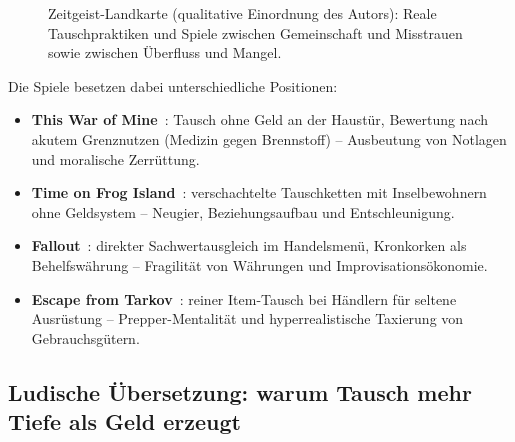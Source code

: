 \documentclass[11pt, a4paper]{article}
\begin{document}
\begin{figure}[H]
\caption[Zeitgeist-Landkarte: reale Praktiken und Spiele]{Zeitgeist-Landkarte
(qualitative Einordnung des Autors): Reale Tauschpraktiken und Spiele zwischen
Gemeinschaft und Misstrauen sowie zwischen Überfluss und Mangel.}
\label{fig:landkarte}
\end{figure}

Die Spiele besetzen dabei unterschiedliche Positionen:
\begin{itemize}
    \item \textbf{This War of Mine}~\cite{twom}: Tausch ohne Geld an der
          Haustür, Bewertung nach akutem Grenznutzen (Medizin gegen
          Brennstoff) -- Ausbeutung von Notlagen und moralische Zerrüttung.
    \item \textbf{Time on Frog Island}~\cite{frogisland}: verschachtelte
          Tauschketten mit Inselbewohnern ohne Geldsystem -- Neugier,
          Beziehungsaufbau und Entschleunigung.
    \item \textbf{Fallout}~\cite{fallout}: direkter Sachwertausgleich im
          Handelsmenü, Kronkorken als Behelfswährung -- Fragilität von
          Währungen und Improvisationsökonomie.
    \item \textbf{Escape from Tarkov}~\cite{tarkov}: reiner Item-Tausch bei
          Händlern für seltene Ausrüstung -- Prepper-Mentalität und
          hyperrealistische Taxierung von Gebrauchsgütern.
\end{itemize}

\subsection{Ludische Übersetzung: warum Tausch mehr Tiefe als Geld erzeugt}
\label{sec:ludisch}
\end{document}
